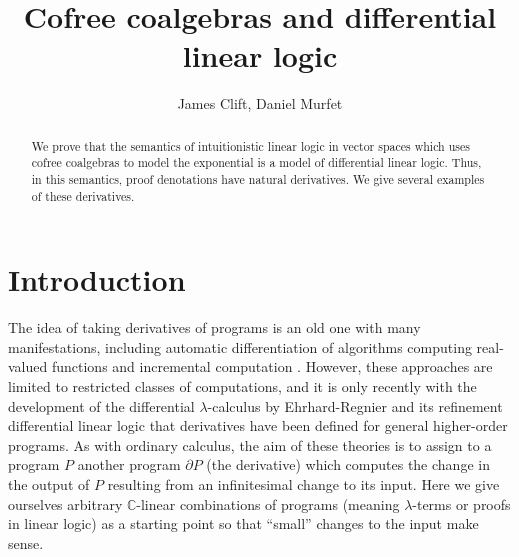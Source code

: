 \documentclass[english,letter paper,12pt,reqno]{article}
\theoremstyle{example}
\def\res{\operatorname{Res}}
\def\inta{\bold{int}}
\def\comp{\underline{\textup{comp}}}
\def\contract{\;\lrcorner\;}
\begin{document}
\def\ScoreOverhang{1pt}

\def\Res{\res\!}
\newcommand{\ud}[1]{\operatorname{d}\!{#1}}
\newcommand{\Ress}[1]{\res_{#1}\!}
\newcommand{\cat}[1]{\mathcal{#1}}
\newcommand{\lto}{\longrightarrow}
\newcommand{\xlto}[1]{\stackrel{#1}\lto}
\newcommand{\mf}[1]{\mathfrak{#1}}
\newcommand{\md}[1]{\mathscr{#1}}
\newcommand{\church}[1]{\underline{#1}}
\newcommand{\prf}[1]{\underline{#1}}
\newcommand{\den}[1]{\llbracket #1 \rrbracket}
\def\l{\,|\,}
\def\sgn{\textup{sgn}}
\def\cont{\operatorname{cont}}
\def\counit{\varepsilon}
\def\inta{\textbf{int}}
\def\binta{\textbf{bint}}
\def\comp{\underline{\textup{comp}}}
\def\mult{\underline{\textup{mult}}}
\def\repeat{\underline{\textup{repeat}}}
\def\contract{\;\lrcorner\;}

\title{Cofree coalgebras and differential linear logic}
\author{James Clift, Daniel Murfet}

\maketitle

\begin{abstract} We prove that the semantics of intuitionistic linear logic in vector spaces which uses cofree coalgebras to model the exponential is a model of differential linear logic. Thus, in this semantics, proof denotations have natural derivatives. We give several examples of these derivatives.
\end{abstract}

\section{Introduction}

The idea of taking derivatives of programs is an old one \cite[\S 2]{paige} with many manifestations, including automatic differentiation of algorithms computing real-valued functions \cite{autodiff} and incremental computation \cite{incdiff}. However, these approaches are limited to restricted classes of computations, and it is only recently with the development of the differential $\lambda$-calculus by Ehrhard-Regnier \cite{difflambda} and its refinement differential linear logic \cite{blutecs, ehrhard-survey} that derivatives have been defined for general higher-order programs. As with ordinary calculus, the aim of these theories is to assign to a program $P$ another program $\partial P$ (the derivative) which computes the change in the output of $P$ resulting from an infinitesimal change to its input. Here we give ourselves arbitrary $\mathbb{C}$-linear combinations of programs (meaning $\lambda$-terms or proofs in linear logic) as a starting point so that ``small'' changes to the input make sense.
\end{document}
